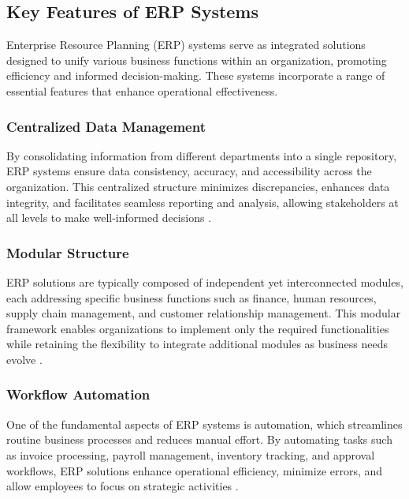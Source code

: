 \subsection{Key Features of ERP Systems}

Enterprise Resource Planning (ERP) systems serve as integrated solutions designed to unify various business functions within an organization, promoting efficiency and informed decision-making. These systems incorporate a range of essential features that enhance operational effectiveness.

\subsubsection{Centralized Data Management}

By consolidating information from different departments into a single repository, ERP systems ensure data consistency, accuracy, and accessibility across the organization. This centralized structure minimizes discrepancies, enhances data integrity, and facilitates seamless reporting and analysis, allowing stakeholders at all levels to make well-informed decisions \cite{oracle_erp, software_connect_erp}.

\subsubsection{Modular Structure}

ERP solutions are typically composed of independent yet interconnected modules, each addressing specific business functions such as finance, human resources, supply chain management, and customer relationship management. This modular framework enables organizations to implement only the required functionalities while retaining the flexibility to integrate additional modules as business needs evolve \cite{sap_features, appmaster_erp}.

\subsubsection{Workflow Automation}

One of the fundamental aspects of ERP systems is automation, which streamlines routine business processes and reduces manual effort. By automating tasks such as invoice processing, payroll management, inventory tracking, and approval workflows, ERP solutions enhance operational efficiency, minimize errors, and allow employees to focus on strategic activities \cite{sap_s4hana, history_erp_mrp}.

